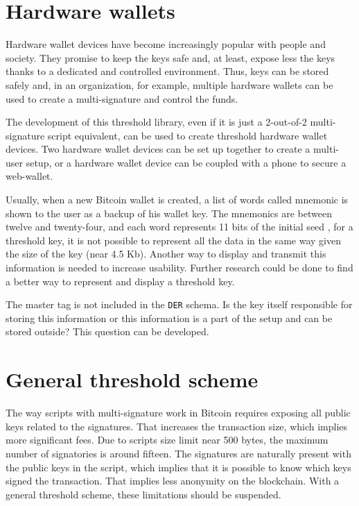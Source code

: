 \section{Hardware wallets}

Hardware wallet devices have become increasingly popular with people and
society. They promise to keep the keys safe and, at least, expose less the keys
thanks to a dedicated and controlled environment. Thus, keys can be stored
safely and, in an organization, for example, multiple hardware wallets can be
used to create a multi-signature and control the funds.

The development of this threshold library, even if it is just a 2-out-of-2
multi-signature script equivalent, can be used to create threshold hardware
wallet devices. Two hardware wallet devices can be set up together to create a
multi-user setup, or a hardware wallet device can be coupled with a phone to
secure a web-wallet.

Usually, when a new Bitcoin wallet is created, a list of words called mnemonic
is shown to the user as a backup of his wallet key. The mnemonics are between
twelve and twenty-four, and each word represents 11 bits of the initial seed
\cite{Mnemonic}, for a threshold key, it is not possible to represent all the
data in the same way given the size of the key (near 4.5 Kb). Another way to
display and transmit this information is needed to increase usability. Further
research could be done to find a better way to represent and display a threshold
key.

The master tag is not included in the \texttt{DER} schema. Is the key itself
responsible for storing this information or this information is a part of the
setup and can be stored outside? This question can be developed.

\section{General threshold scheme}

The way scripts with multi-signature work in Bitcoin requires exposing all
public keys related to the signatures. That increases the transaction size,
which implies more significant fees. Due to scripts size limit near 500 bytes,
the maximum number of signatories is around fifteen. The signatures are
naturally present with the public keys in the script, which implies that it is
possible to know which keys signed the transaction. That implies less anonymity
on the blockchain. With a general threshold scheme, these limitations should be
suspended.

